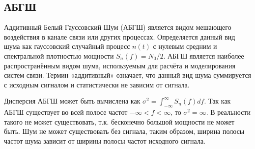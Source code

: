 \subsection{АБГШ}
\label{sec:awgn}

Аддитивный Белый Гауссовский Шум (АБГШ) является видом мешающего воздействия в канале связи или других процессах. Определяется данный вид шума как гауссовский случайный процесс $n(t )$ с нулевым средним и спектральной плотностью мощности $S_n( f ) = N_0 / 2$. АБГШ является наиболее распространённым видом шума, используемым для расчёта и моделирования систем связи. Термин «аддитивный» означает, что данный вид шума суммируется с исходным сигналом и статистически не зависим от сигнала.

Дисперсия АБГШ может быть вычислена как $\sigma^2 = \int_{-\infty}^{\infty}S_n(f)df$. Так как АБГШ существует во всей полосе частот $-\infty < f < \infty$, то $\sigma^2 = \infty$. В реальности такого не может существовать, т.к. бесконечно большой мощности не может быть. Шум не может существовать без сигнала, таким образом, ширина полосы частот шума зависит от ширины полосы частот исходного сигнала. 